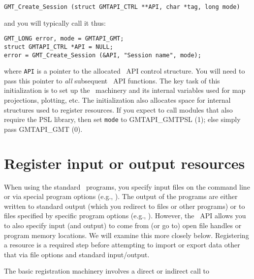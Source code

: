 \documentclass{report}
\begin{document}
\begin{verbatim}
GMT_Create_Session (struct GMTAPI_CTRL **API, char *tag, long mode)
\end{verbatim}
and you will typically call it thus:
\begin{verbatim}
GMT_LONG error, mode = GMTAPI_GMT;
struct GMTAPI_CTRL *API = NULL;
error = GMT_Create_Session (&API, "Session name", mode);
\end{verbatim}
where \texttt{API} is a pointer to the allocated \GMT\ API control structure.  You will need to
pass this pointer to \emph{all} subsequent \GMT\ API functions.  The key task of this initialization
is to set up the \GMT\ machinery and its internal variables used for map projections, plotting,
etc.  The initialization also allocates space for internal structures used to register resources.
If you expect to call modules that also require the PSL library, then set \texttt{mode} to
GMTAPI\_GMTPSL (1); else simply pass GMTAPI\_GMT (0).

\section{Register input or output resources}

When using the standard \GMT\ programs, you specify input files on
the command line or via special program options (e.g., ). The output of
the programs are either written to standard output (which you redirect to files or other programs)
or to files specified by specific program options (e.g., ).  However, the
\GMT\ API allows you to also specify input (and output) to come from (or go to) open file handles
or program memory locations.  We will examine this more closely below.  Registering a
resource is a required step before attempting to import or export data other that via file options
and standard input/output.

The basic registration machinery involves a direct or indirect call to
\end{document}
